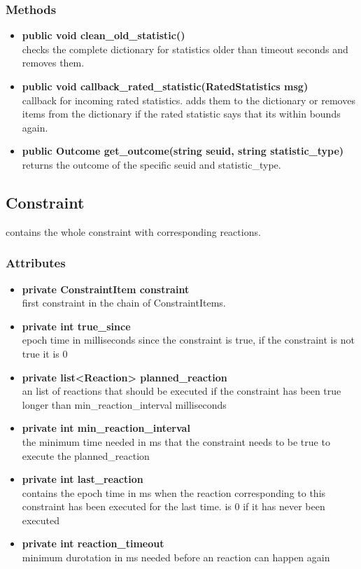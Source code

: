 \subsubsection{Methods}
\begin{itemize}
	\item \textbf{ public void clean\_old\_statistic() }\\
		checks the complete dictionary for statistics older than timeout seconds and removes them.
	\item \textbf{ public void callback\_rated\_statistic(RatedStatistics msg) }\\
		callback for incoming rated statistics. adds them to the dictionary or removes items from the dictionary if the rated statistic says that its within bounds again. 
	\item \textbf{ public Outcome get\_outcome(string seuid, string statistic\_type) }\\
		returns the outcome of the specific seuid and statistic\_type.
\end{itemize}

\subsection{Constraint }
contains the whole constraint with corresponding reactions.


\subsubsection{Attributes}
\begin{itemize}
	\item \textbf{ private ConstraintItem constraint }\\
	first constraint in the chain of ConstraintItems.
	\item \textbf{ private int true\_since }\\
	epoch time in milliseconds since the constraint is true,
	if the constraint is not true it is 0
	\item \textbf{ private list<Reaction> planned\_reaction }\\
	an list of reactions that should be executed if the constraint has been true longer than min\_reaction\_interval milliseconds
	\item \textbf{ private int min\_reaction\_interval }\\
	the minimum time needed in ms that the constraint needs to be true to execute the planned\_reaction
	\item \textbf{ private int last\_reaction }\\
	contains the epoch time in ms when the reaction corresponding to this constraint has been executed for the last time.
		is 0 if it has never been executed
	\item \textbf{ private int reaction\_timeout }\\
	minimum durotation in ms needed before an reaction can happen again
\end{itemize}
